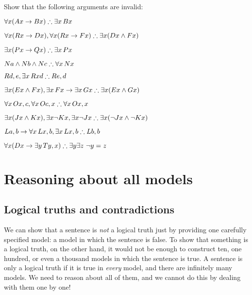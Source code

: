 \begin{practiceproblems}
\problempart
Show that the following arguments are invalid:
\begin{earg}
\item $\forall x(\atom{A}{x} \eif \atom{B}{x}) \therefore \exists x\,\atom{B}{x}$
\item $\forall x(\atom{R}{x} \eif \atom{D}{x}), \forall x(\atom{R}{x} \eif \atom{F}{x}) \therefore \exists x(\atom{D}{x} \eand \atom{F}{x})$
\item $\exists x(\atom{P}{x}\eif \atom{Q}{x}) \therefore \exists x\,\atom{P}{x}$
\item $\atom{N}{a} \eand \atom{N}{b} \eand \atom{N}{c} \therefore \forall x\,\atom{N}{x}$
\item $\atom{R}{d,e}, \exists x\,\atom{R}{xd} \therefore \atom{R}{e,d}$
\item $\exists x(\atom{E}{x} \eand \atom{F}{x}), \exists x\,\atom{F}{x} \eif \exists x\,\atom{G}{x} \therefore \exists x(\atom{E}{x} \eand \atom{G}{x})$
\item $\forall x\,\atom{O}{x,c}, \forall x\,\atom{O}{c,x} \therefore \forall x\,\atom{O}{x,x}$
\item $\exists x(\atom{J}{x} \eand \atom{K}{x}), \exists x \enot \atom{K}{x}, \exists x \enot \atom{J}{x} \therefore \exists x(\enot \atom{J}{x} \eand \enot \atom{K}{x})$
\item $\atom{L}{a,b} \eif \forall x\,\atom{L}{x,b}, \exists x\,\atom{L}{x,b} \therefore \atom{L}{b,b}$
\item $\forall x(\atom{D}{x} \eif \exists y\,\atom{T}{y,x}) \therefore \exists y \exists z\ \enot y= z$
\end{earg}


\end{practiceproblems}


\chapter{Reasoning about all models}

\section{Logical truths and contradictions}
We can show that a sentence is \emph{not} a logical truth just by providing one carefully specified model: a model in which the sentence is false. To show that something is a logical truth, on the other hand, it would not be enough to construct ten, one hundred, or even a thousand models in which the sentence is true. A sentence is only a logical truth if it is true in \emph{every} model, and there are infinitely many models. We need to reason about all of them, and we cannot do this by dealing with them one by one!


